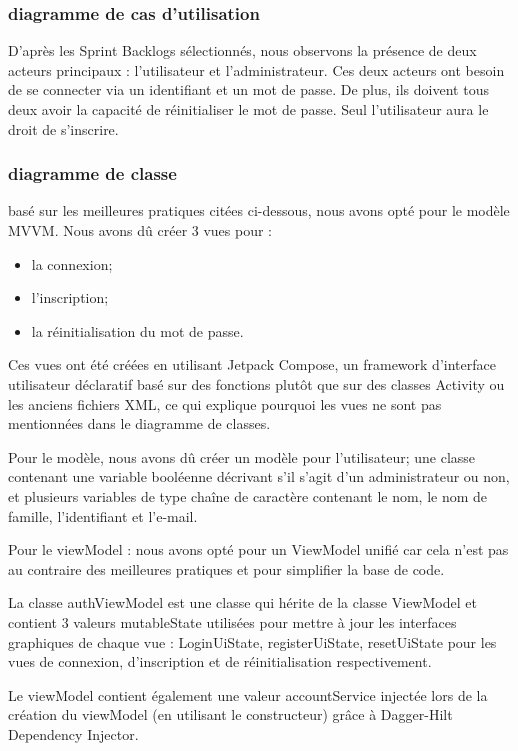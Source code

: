 \subsubsection{diagramme de cas d'utilisation}
D'après les Sprint Backlogs sélectionnés, nous observons la présence de deux acteurs principaux : l'utilisateur et l'administrateur. Ces deux acteurs ont besoin de se connecter via un identifiant et un mot de passe. De plus, ils doivent tous deux avoir la capacité de réinitialiser le mot de passe. Seul l'utilisateur aura le droit de s'inscrire.

\newpage
\subsubsection{diagramme de classe}
basé sur les meilleures pratiques citées ci-dessous, nous avons opté pour le modèle MVVM. Nous avons dû créer 3 vues pour : 
\begin{itemize}
  \item la connexion;
  \item l'inscription;
  \item la réinitialisation du mot de passe. 
\end{itemize}
Ces vues ont été créées en utilisant Jetpack Compose, un framework d'interface utilisateur déclaratif basé sur des fonctions plutôt que sur des classes Activity ou les anciens fichiers XML, ce qui explique pourquoi les vues ne sont pas mentionnées dans le diagramme de classes.

Pour le modèle, nous avons dû créer un modèle pour l'utilisateur; une classe contenant une variable booléenne décrivant s'il s'agit d'un administrateur ou non, et plusieurs variables de type chaîne de caractère contenant le nom, le nom de famille, l'identifiant et l'e-mail.

Pour le viewModel : nous avons opté pour un ViewModel unifié car cela n'est pas au contraire des meilleures pratiques et pour simplifier la base de code.

La classe authViewModel est une classe qui hérite de la classe ViewModel et contient 3 valeurs mutableState utilisées pour mettre à jour les interfaces graphiques de chaque vue : LoginUiState, registerUiState, resetUiState pour les vues de connexion, d'inscription et de réinitialisation respectivement.

Le viewModel contient également une valeur accountService injectée lors de la création du viewModel (en utilisant le constructeur) grâce à Dagger-Hilt Dependency Injector.

